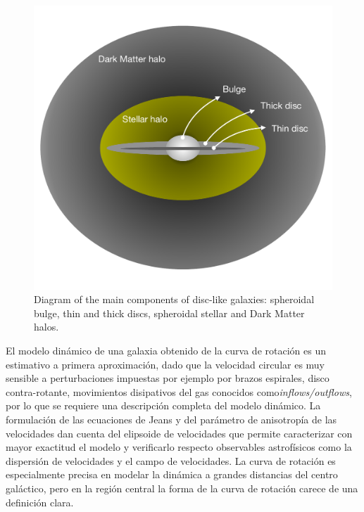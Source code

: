 \begin{figure}
  \centering
    \includegraphics[width=0.95\columnwidth]{Kap1/diagram_disk_galaxy.pdf}
  \caption{ Diagram of the main components of disc-like galaxies: spheroidal bulge, thin and thick discs, spheroidal stellar and Dark Matter halos.}
  \label{fig:Fig_diagram_galaxy}
\end{figure}

El modelo dinámico de una galaxia obtenido de la curva de rotación es un estimativo a primera aproximación, dado que la velocidad circular es muy sensible a perturbaciones impuestas por ejemplo por brazos espirales, disco contra-rotante, movimientos disipativos del gas conocidos como\emph{inflows/outflows}, por lo que se requiere una descripción completa del modelo dinámico. La formulación de las ecuaciones de Jeans y del parámetro de anisotropía de las velocidades dan cuenta del elipsoide de velocidades que permite caracterizar con mayor exactitud el modelo y verificarlo respecto observables astrofísicos como la dispersión de velocidades y el campo de velocidades. La curva de rotación es especialmente precisa en modelar la dinámica a grandes distancias del centro galáctico, pero en la región central la forma de la curva de rotación carece de una definición clara.\\







